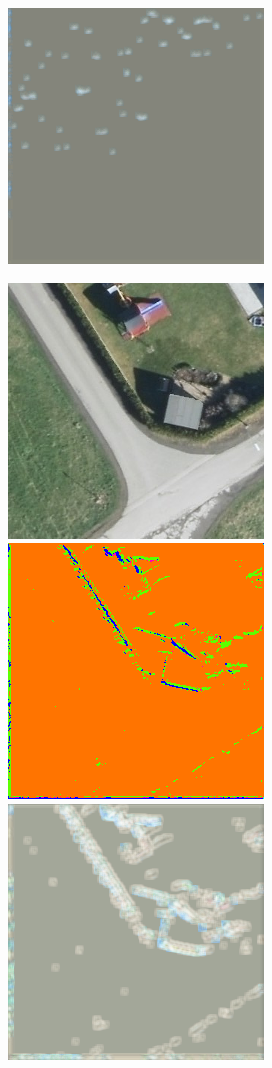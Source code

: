 \begin{figure}
    \includegraphics[width=\WnetPredictionsImageWidth]{images/wnet/46d-20/19743-restored}

    \vspace{2mm}
    \includegraphics[width=\WnetPredictionsImageWidth]{images/wnet/original/63585-image} \hfill
    \includegraphics[width=\WnetPredictionsImageWidth]{images/wnet/36d-6/63585-prediction} \hfill
    \includegraphics[width=\WnetPredictionsImageWidth]{images/wnet/36d-6/63585-restored} \hfill

\end{figure}
